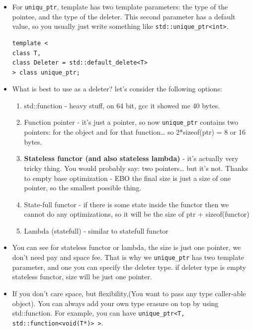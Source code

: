 \documentclass[a4paper,11pt,twoside]{book}
\begin{document}
\begin{itemize}
	\item For \texttt{uniqu\_ptr}, template has two template parameters: the type of the pointee, and the type of the deleter. This second parameter has a default value, so you usually just write something like \texttt{std::unique\_ptr<int>}.
\begin{lstlisting}
template <
class T,
class Deleter = std::default_delete<T>
> class unique_ptr;
	\end{lstlisting}

	\item What is best to use as a deleter? let's consider the following options:
	\begin{enumerate}
		\item std::function - heavy stuff, on 64 bit, gcc it showed me 40 bytes.
		
		\item Function pointer - it’s just a pointer, so now \texttt{unique\_ptr} contains two pointers: for the object and for that function… so 2*sizeof(ptr) = 8 or 16 bytes.
		
		\item \textbf{Stateless functor (and also stateless lambda)} - it’s actually very tricky thing. You would probably say: two pointers… but it’s not. Thanks to empty base optimization - EBO the final size is just a size of one pointer, so the smallest possible thing.
		
		\item State-full functor - if there is some state inside the functor then we cannot do any optimizations, so it will be the size of ptr + sizeof(functor)
		
		\item Lambda (statefull) - similar to statefull functor
	\end{enumerate}

	\item You can see for stateless functor or lambda, the size is just one pointer, we don't need pay and space fee. That is why we \texttt{unique\_ptr} has two template parameter, and one you can specify the deleter type. if deleter type is empty stateless functor, size will be just one pointer. 
	
	
	\item If you don't care space, but flexibility,(You want to pass any type caller-able object).  You can always add your own type erasure on top by using std::function. For example, you can have \texttt{unique\_ptr<T, std::function<void(T*)> >}.
	

\end{itemize}
\end{document}

